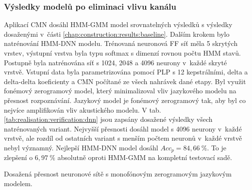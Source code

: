 \subsubsection{Výsledky modelů po eliminaci vlivu kanálu}

Aplikací CMN dosáhl HMM-GMM model srovnatelných výsledků s výsledky dosaženými v~části \ref{chap:construction:results:baseline}.
Dalším krokem bylo natrénování HMM-DNN modelu.
Trénovaná neuronová FF síť měla 5 skrytých vrstev, výstupní vrstva byla typu softmax s dimenzí rovnou počtu HMM stavů.
Postupně byla natrénována síť s 1024, 2048 a 4096 neurony v~každé skryté vrstvě.
Vstupní data byla parametrizována pomocí PLP s 12 kepstrálními, delta a delta-delta koeficienty a CMN počítané ze všech nahrávek dané etapy.
Byl využit fonémový zerogramový model, který minimalizoval vliv jazykového modelu na přesnost rozpoznávání.
Jazykový model je fonémový zerogramový tak, aby byl co nejvíce amplifikován vliv akustického modelu.
V tab. \ref{tab:realisation:verification:dnn} jsou zapsány dosažené výsledky všech natrénovaných variant.
Nejvyšší přesnosti dosáhl model s 4096 neurony v~každé vrstvě, ale rozdíl od ostatních variant s menším počtem neuronů v~každé vrstvě nebyl významný.
Nejlepší HMM-DNN model dosáhl $Acc_{p} = 84,66\ \%$.
To je zlepšení o $6,97\ \%$ absolutně oproti HMM-GMM na kompletní testovací sadě.

\begin{table}[htpb]
  \centering
  \def\arraystretch{1.5}
  \caption[Přesnost neuronové sítě s monofónovým zerogramovým LM.]{Dosažená přesnost neuronové sítě s monofónovým zerogramovým jazykovým modelem.}
  \label{tab:realisation:verification:dnn}
\end{table}
